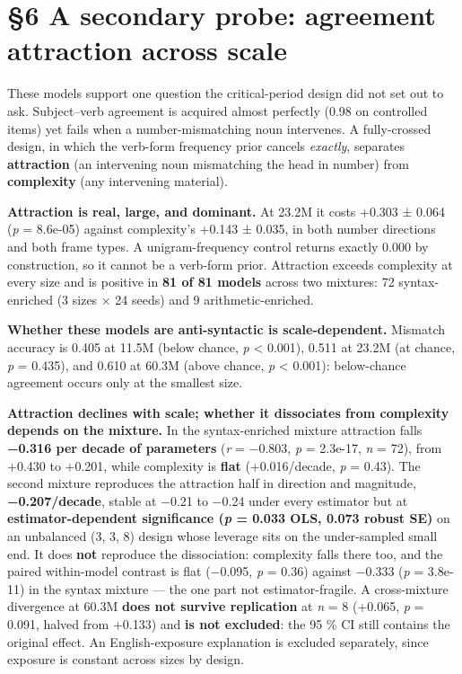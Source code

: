 \documentclass[11pt]{article}
\begin{document}
\section{§6 A secondary probe: agreement attraction across scale}\label{a-secondary-probe-agreement-attraction-across-scale}

These models support one question the critical-period design did not set out to ask.
Subject--verb agreement is acquired almost perfectly (0.98 on controlled items) yet fails when
a number-mismatching noun intervenes. A fully-crossed design, in which the verb-form frequency
prior cancels \emph{exactly}, separates \textbf{attraction} (an intervening noun mismatching the head in
number) from \textbf{complexity} (any intervening material).

\textbf{Attraction is real, large, and dominant.} At 23.2M it costs +0.303 ± 0.064
(\emph{p} = 8.6e-05) against complexity's +0.143 ± 0.035, in both number directions and both frame
types. A unigram-frequency control returns exactly 0.000 by construction, so it cannot be a
verb-form prior. Attraction exceeds complexity at every size and is positive in \textbf{81 of 81
models} across two mixtures: 72 syntax-enriched (3 sizes × 24 seeds) and 9 arithmetic-enriched.

\textbf{Whether these models are anti-syntactic is scale-dependent.} Mismatch accuracy is 0.405 at
11.5M (below chance, \emph{p} \textless{} 0.001), 0.511 at 23.2M (at chance, \emph{p} = 0.435), and 0.610 at 60.3M
(above chance, \emph{p} \textless{} 0.001): below-chance agreement occurs only at the smallest size.

\textbf{Attraction declines with scale; whether it dissociates from complexity depends on the
mixture.} In the syntax-enriched mixture attraction falls \textbf{−0.316 per decade of
parameters} (\emph{r} = −0.803, \emph{p} = 2.3e-17, \emph{n} = 72), from +0.430 to +0.201, while complexity is
\textbf{flat} (+0.016/decade, \emph{p} = 0.43). The second mixture reproduces the attraction half in
direction and magnitude, \textbf{−0.207/decade}, stable at −0.21 to −0.24 under every estimator
but at \textbf{estimator-dependent significance (\emph{p} = 0.033 OLS, 0.073 robust SE)} on an
unbalanced (3, 3, 8) design whose leverage sits on the under-sampled small end. It does
\textbf{not} reproduce the dissociation: complexity falls there too, and the paired within-model
contrast is flat (−0.095, \emph{p} = 0.36) against −0.333 (\emph{p} = 3.8e-11) in the syntax mixture —
the one part not estimator-fragile. A cross-mixture divergence at 60.3M \textbf{does not survive
replication} at \emph{n} = 8 (+0.065, \emph{p} = 0.091, halved from +0.133) and \textbf{is not excluded}: the
95 \% CI still contains the original effect. An English-exposure explanation is excluded
separately, since exposure is constant across sizes by design.
\end{document}
